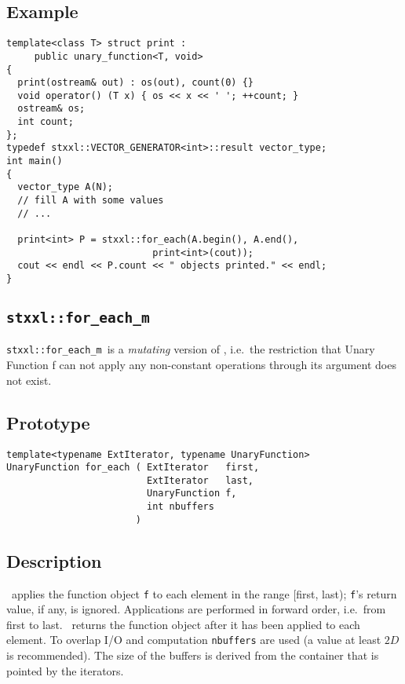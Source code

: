 \documentclass[twoside]{book}
\begin{document}
\subsection*{Example}
\begin{lstlisting}
template<class T> struct print : 
     public unary_function<T, void>
{
  print(ostream& out) : os(out), count(0) {}
  void operator() (T x) { os << x << ' '; ++count; }
  ostream& os;
  int count;
};
typedef stxxl::VECTOR_GENERATOR<int>::result vector_type;
int main()
{
  vector_type A(N);
  // fill A with some values
  // ...  

  print<int> P = stxxl::for_each(A.begin(), A.end(), 
                          print<int>(cout));
  cout << endl << P.count << " objects printed." << endl;
}
\end{lstlisting}

\newcommand{\xforeachm}{{\texttt{stxxl::for\_each\_m}}}
\subsection{\xforeachm}
\xforeachm\ is a \emph{mutating} version of \xforeach, i.e.\ 
the restriction that Unary Function f can not apply any non-constant
operations through its argument does not exist.

\subsection*{Prototype}
\begin{lstlisting}
template<typename ExtIterator, typename UnaryFunction>
UnaryFunction for_each ( ExtIterator   first,
                         ExtIterator   last,
                         UnaryFunction f,
                         int nbuffers
                       )        
\end{lstlisting}
\subsection*{Description}
\xforeach\ applies the function object \texttt{f} to each element in the range
[first, last); \texttt{f}'s return value, if any, is
ignored. Applications are 
performed in forward order, i.e.\ from first to last. \xforeach\ returns
the function object after it has been applied to each element. 
 To
overlap I/O and computation \texttt{nbuffers} are used (a value at
least $2D$ is recommended). The size of
the buffers is derived from the container that is pointed by the
iterators. 
\end{document}
